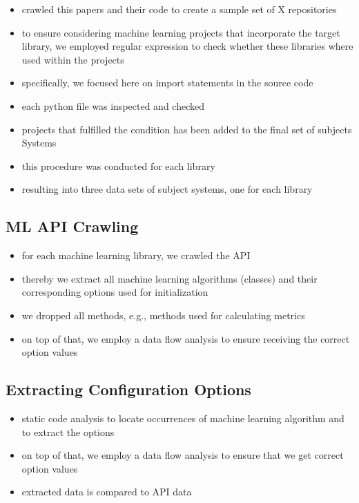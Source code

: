 \documentclass[sigconf,review,anonymous]{acmart}
\begin{document}
\begin{itemize}
    \item crawled this papers and their code to create a sample set of X repositories
    \item to ensure considering machine learning projects that incorporate the target library, we employed regular expression to check whether these libraries where used within the projects
    \item specifically, we focused here on import statements in the source code
    \item each python file was inspected and checked
    \item projects that fulfilled the condition has been added to the final set of subjects Systems
    \item this procedure was conducted for each library
    \item resulting into three data sets of subject systems, one for each library
\end{itemize}

\subsection{ML API Crawling}
\begin{itemize}
    \item for each machine learning library, we crawled the API
    \item thereby we extract all machine learning algorithms (classes) and their corresponding options used for initialization
    \item we dropped all methods, e.g., methods used for calculating metrics
    \item on top of that, we employ a data flow analysis to ensure receiving the correct option values
\end{itemize}

\subsection{Extracting Configuration Options}
\begin{itemize}
    \item static code analysis to locate occurrences of machine learning algorithm and to extract the options
    \item on top of that, we employ a data flow analysis to ensure that we get correct option values
    \item extracted data is compared to API data
\end{itemize}
\end{document}
